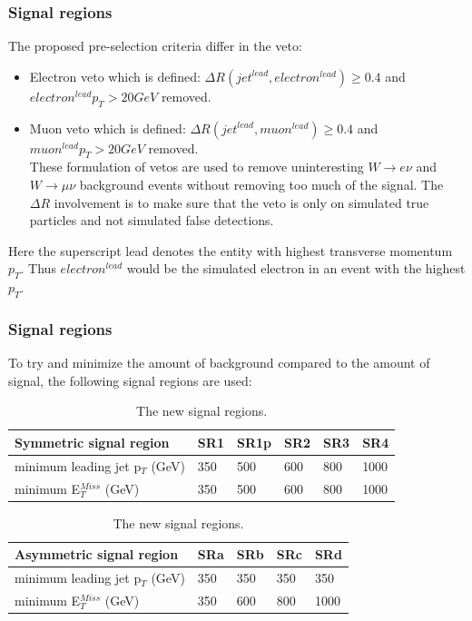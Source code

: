 \documentclass[handout]{beamer}
\begin{document}
\begin{frame}[shrink=20]\frametitle{Signal regions}
\begin{block}{}
The proposed pre-selection criteria differ in the veto:
\begin{itemize}
\item Electron veto which is defined: $\Delta R (jet^{lead},electron^{lead})\geq 0.4$ and \\
$electron^{lead} p_T>20 GeV$ removed.
\item Muon veto which is defined: $\Delta R (jet^{lead},muon^{lead})\geq 0.4$ and \\
$muon^{lead} p_T>20 GeV$ removed. \\
These formulation of vetos are used to remove uninteresting $W \rightarrow e \nu$ and $W \rightarrow \mu \nu$ background events without removing too much of the signal. The $\Delta R$ involvement is to make sure that the veto is only on simulated true particles and not simulated false detections.
\end{itemize}
Here the superscript lead denotes the entity with highest transverse momentum $p_T$. Thus $electron^{lead}$ would be the simulated electron in an event with the highest $p_T$.
\end{block}
\end{frame}
\begin{frame}[shrink=20]\frametitle{Signal regions}
\begin{block}{}
To try and minimize the amount of background compared to the amount of signal, the following  signal regions are used:
\end{block}
\begin{table}[h]
\renewcommand{\arraystretch}{1.2} %
\begin{center}
\begin{tabular}{l l l l l l}
\hline
Symmetric signal region & SR1 & SR1p & SR2 & SR3 & SR4 \\ \hline
minimum leading jet p$_T$ (GeV) & 350 &500& 600 & 800 & 1000 \\
minimum E$^{Miss}_T$ (GeV) & 350&500 & 600 & 800 & 1000 \\
\end{tabular}
\begin{tabular}{l l l l l} \hline
Asymmetric signal region & SRa &  SRb & SRc & SRd \\ \hline
minimum leading jet p$_T$ (GeV) & 350 & 350 & 350 & 350 \\
minimum E$^{Miss}_T$ (GeV) & 350 & 600 & 800 & 1000 \\ \hline
\end{tabular}
\caption{The new signal regions.}
\label{tab:newsr}
\end{center}
\renewcommand{\arraystretch}{1.0} %
\end{table}
\end{frame}
\end{document}
